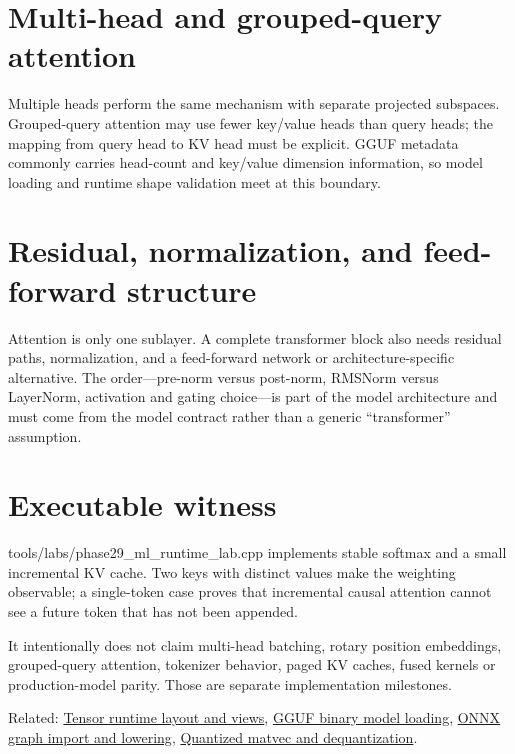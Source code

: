 \section{Multi-head and grouped-query attention}\label{appendix-ea2dadd21ce5-multi-head-and-grouped-query-attention}

Multiple heads perform the same mechanism with separate projected subspaces. Grouped-query attention may use fewer key/value heads than query heads; the mapping from query head to KV head must be explicit. GGUF metadata commonly carries head-count and key/value dimension information, so model loading and runtime shape validation meet at this boundary.

\section{Residual, normalization, and feed-forward structure}\label{appendix-ea2dadd21ce5-residual-normalization-and-feed-forward-structure}

Attention is only one sublayer. A complete transformer block also needs residual paths, normalization, and a feed-forward network or architecture-specific alternative. The order---pre-norm versus post-norm, RMSNorm versus LayerNorm, activation and gating choice---is part of the model architecture and must come from the model contract rather than a generic ``transformer'' assumption.

\section{Executable witness}\label{appendix-ea2dadd21ce5-executable-witness}

tools/labs/phase29\_ml\_runtime\_lab.cpp implements stable softmax and a small incremental KV cache. Two keys with distinct values make the weighting observable; a single-token case proves that incremental causal attention cannot see a future token that has not been appended.

It intentionally does not claim multi-head batching, rotary position embeddings, grouped-query attention, tokenizer behavior, paged KV caches, fused kernels or production-model parity. Those are separate implementation milestones.

Related: \hyperref[appendix-cebadf3106d1]{Tensor runtime layout and views}, \hyperref[appendix-fef72dd246f2]{GGUF binary model loading}, \hyperref[appendix-a87217e3af2b]{ONNX graph import and lowering}, \hyperref[appendix-241c0e42ac2d]{Quantized matvec and dequantization}.
